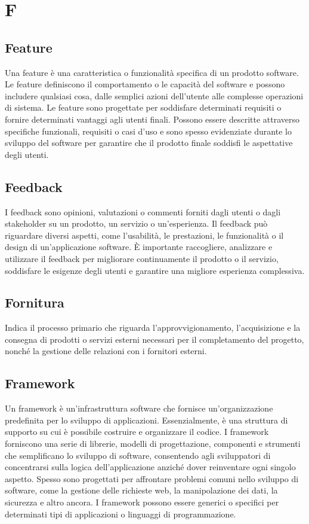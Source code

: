 \section{F} 
\subsection{Feature} 
Una feature è una caratteristica o funzionalità specifica di un prodotto software. Le feature definiscono il comportamento o le capacità del software e possono includere qualsiasi cosa, dalle semplici azioni dell'utente alle complesse operazioni di sistema. Le feature sono progettate per soddisfare determinati requisiti o fornire determinati vantaggi agli utenti finali. Possono essere descritte attraverso specifiche funzionali, requisiti o casi d'uso e sono spesso evidenziate durante lo sviluppo del software per garantire che il prodotto finale soddisfi le aspettative degli utenti.
\subsection{Feedback} 
I feedback sono opinioni, valutazioni o commenti forniti dagli utenti o dagli stakeholder su un prodotto, un servizio o un'esperienza. Il feedback può riguardare diversi aspetti, come l'usabilità, le prestazioni, le funzionalità o il design di un'applicazione software. È importante raccogliere, analizzare e utilizzare il feedback per migliorare continuamente il prodotto o il servizio, soddisfare le esigenze degli utenti e garantire una migliore esperienza complessiva.
\subsection{Fornitura} 
Indica il processo primario che riguarda l'approvvigionamento, l'acquisizione e la consegna di prodotti o servizi esterni necessari per il completamento del progetto, nonché la gestione delle relazioni con i fornitori esterni.
\subsection{Framework} 
Un framework è un'infrastruttura software che fornisce un'organizzazione predefinita per lo sviluppo di applicazioni. Essenzialmente, è una struttura di supporto su cui è possibile costruire e organizzare il codice. I framework forniscono una serie di librerie, modelli di progettazione, componenti e strumenti che semplificano lo sviluppo di software, consentendo agli sviluppatori di concentrarsi sulla logica dell'applicazione anziché dover reinventare ogni singolo aspetto. Spesso sono progettati per affrontare problemi comuni nello sviluppo di software, come la gestione delle richieste web, la manipolazione dei dati, la sicurezza e altro ancora. I framework possono essere generici o specifici per determinati tipi di applicazioni o linguaggi di programmazione.

